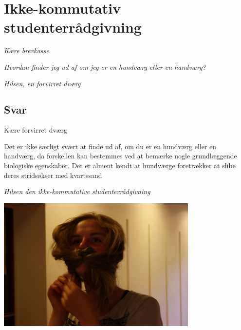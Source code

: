 \begin{minipage}[t]{100mm}
\vspace{3mm}
\section*{Ikke-kommutativ studenterrådgivning}
\emph{Kære brevkasse}

\emph{Hvordan finder jeg ud af om jeg er en hun\-dværg eller en han\-dværg?}

\emph{Hilsen, en forvirret dværg}

\subsection*{Svar}
Kære forvirret dværg

Det er ikke særligt svært at finde ud af, om du er en hundværg eller en handværg, da forskellen kan bestemmes ved at bemærke nogle grundlæggende biologiske egenskaber. Det er alment kendt at hundværge foretrækker at slibe deres stridsøkser med kvartssand

{\flushright\emph{Hilsen den ikke-kommutative studenterrådgivning}}

\includegraphics[width=100mm]{kum.jpg}


\end{minipage}

